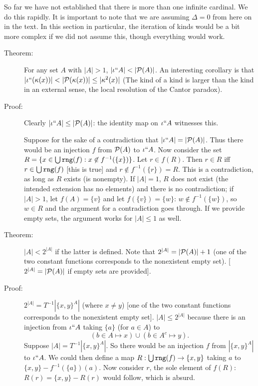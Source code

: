 \documentclass[12pt]{article}
\begin{document}
So far we have not established that there is more than one infinite cardinal.  We do this rapidly.  It is important to note that we are assuming $\Delta=0$ from here on in the text.  In this section in particular, the iteration of kinds would be a bit more complex if we did not assume this, though everything would work.

\begin{description}

\item[Theorem:]  For any set $A$ with $|A|>1$, $|\iota``A|<|{\cal P}(A)|$.  An interesting corollary is that $|\iota``(\kappa(x))| < |{\cal P}(\kappa(x))| \leq |\kappa^2(x)|$ (The kind of a kind is larger than the kind in an external sense, the local resolution of the Cantor paradox).

\item[Proof:]  Clearly $|\iota``A|\leq |{\cal P}(A)|$:  the identity map on $\iota``A$ witnesses this.

Suppose for the sake of a contradiction that $|\iota``A|=|{\cal P}(A)|$.  Thus there would be an injection $f$ from ${\cal P}(A)$ to $\iota``A$.  Now consider the set $R = \{x \in \bigcup {\tt rng}(f):x \not\in f^{-1}(\{x\})\}$.  Let $r \in f(R)$.  Then $r \in R$ iff \newline $r \in \bigcup {\tt rng}(f)$ [this is true] and $r \not\in f^{-1}(\{r\}) = R$.  This is a contradiction, as long as $R$ exists (is nonempty).  If $|A|=1$, $R$ does not exist (the intended extension has no elements) and there is no contradiction;
if $|A|>1$, let $f(A)=\{v\}$ and let $f(\{v\}) = \{w\}$:  $w \not\in f^{-1}(\{w\})$, so $w \in R$ and the argument for a contradiction goes through.  If we provide empty sets, the argument works for $|A| \leq 1$ as well.

\item[Theorem:] $|A|<2^{|A|}$ if the latter is defined.  Note that $2^{|A|}=|{\cal P}(A)|+1$ (one of the two constant functions corresponds to the nonexistent empty set). [$2^{|A|}=|{\cal P}(A)|$ if empty sets are provided].

\item[Proof:]  $2^{|A|}= T^{-1}|\{x,y\}^A|$ (where $x \neq y$) [one of the two constant functions corresponds to the nonexistent empty set].  $|A| \leq 2^{|A|}$ because there is an injection  from $\iota``A$ taking $\{a\}$ (for $a \in A$) to $$(b \in A \mapsto x) \cup (b \in A^c\mapsto y).$$
Suppose $|A| = T^{-1}|\{x,y\}^A|$.  So there would be an injection $f$ from $|\{x,y\}^A|$ to $\iota``A$.  We could then define a map $R:\bigcup {\tt rng}(f) \rightarrow \{x,y\}$ taking $a$ to
$\{x,y\} - f^{-1}(\{a\})(a)$.  Now consider $r$, the sole element of $f(R)$: $R(r) = \{x,y\} - R(r)$ would follow, which is absurd.


\end{description}
\end{document}
